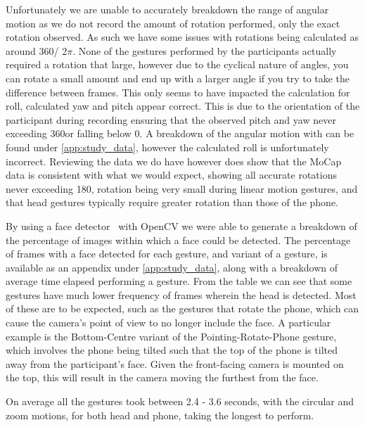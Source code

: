 Unfortunately we are unable to accurately breakdown the range of angular motion as we do not record the amount of rotation performed, only the exact rotation observed. As such we have some issues with rotations being calculated as around 360\textdegree / 2$\pi$. None of the gestures performed by the participants actually required a rotation that large, however due to the cyclical nature of angles, you can rotate a small amount and end up with a larger angle if you try to take the difference between frames. 
This only seems to have impacted the calculation for roll, calculated yaw and pitch appear correct. This is due to the orientation of the participant during recording ensuring that the observed pitch and yaw never exceeding 360\textdegree or falling below 0\textdegree. A breakdown of the angular motion with can be found under \autoref{app:study_data}, however the calculated roll is unfortunately incorrect.
Reviewing the data we do have however does show that the MoCap data is consistent with what we would expect, showing all accurate rotations never exceeding 180\textdegree, rotation being very small during linear motion gestures, and that head gestures typically require greater rotation than those of the phone.

By using a face detector~\cite{yu2022yunet} with OpenCV we were able to generate a breakdown of the percentage of images within which a face could be detected. The percentage of frames with a face detected for each gesture, and variant of a gesture, is available as an appendix under \autoref{app:study_data}, along with a breakdown of average time elapsed performing a gesture. 
From the table we can see that some gestures have much lower frequency of frames wherein the head is detected. Most of these are to be expected, such as the gestures that rotate the phone, which can cause the camera's point of view to no longer include the face. A particular example is the Bottom-Centre variant of the Pointing-Rotate-Phone gesture, which involves the phone being tilted such that the top of the phone is tilted away from the participant's face. Given the front-facing camera is mounted on the top, this will result in the camera moving the furthest from the face.

On average all the gestures took between 2.4 - 3.6 seconds, with the circular and zoom motions, for both head and phone, taking the longest to perform.

